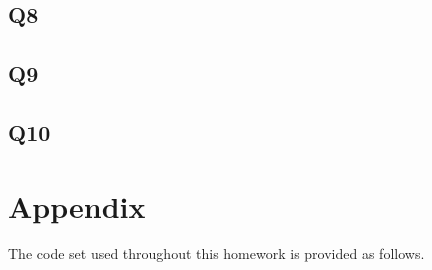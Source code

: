 \documentclass{assignment}
\begin{document}
\subsection{Q8}

\subsection{Q9}

\subsection{Q10}

\section*{Appendix}
The code set used throughout this homework is provided as follows. 

% 



\nocite{*} 
\end{document}
